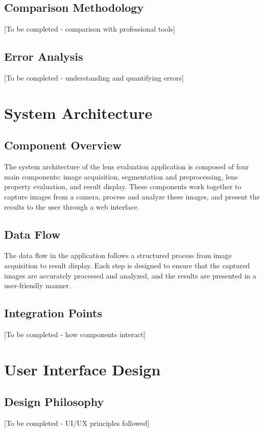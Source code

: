 \subsection{Comparison Methodology}
[To be completed - comparison with professional tools]

\subsection{Error Analysis}
[To be completed - understanding and quantifying errors]

\section{System Architecture}

\subsection{Component Overview}
The system architecture of the lens evaluation application is composed of four main components: image acquisition, segmentation and preprocessing, lens property evaluation, and result display. These components work together to capture images from a camera, process and analyze these images, and present the results to the user through a web interface.

\subsection{Data Flow}
The data flow in the application follows a structured process from image acquisition to result display. Each step is designed to ensure that the captured images are accurately processed and analyzed, and the results are presented in a user-friendly manner.

\subsection{Integration Points}
[To be completed - how components interact]

\section{User Interface Design}

\subsection{Design Philosophy}
[To be completed - UI/UX principles followed]

